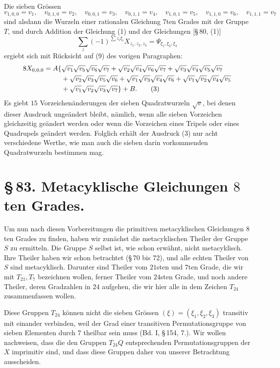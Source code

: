 \documentclass[11pt]{article}
\begin{document}
Die sieben Grössen
\begin{equation}
 v_{1,0,0}=v_1,
 \quad v_{0,1,0}=v_2,
 \quad v_{0,0,1}=v_3,
 \quad v_{0,1,1}=v_4,
 \quad v_{1,0,1}=v_5,
 \quad v_{1,1,0}=v_6,
 \quad v_{1,1,1}=v_7
 \tag{2}
\end{equation}
sind alsdann die Wurzeln einer rationalen Gleichung $7$ten Grades mit der Gruppe $T$, und durch Addition der Gleichung (1) und der Gleichungen [\S\,80, (1)]
\[
 \sum_z(-1)^{\sum z_i\xi_i}X_{z_1,z_2,z_3}=\Psi_{\xi_1,\xi_2,\xi_3}
\]
ergiebt sich mit Rücksicht auf (9) des vorigen Paragraphen:
\begin{align}
8X_{0,0,0}=A\{&\sqrt{v_1}\sqrt{v_5}\sqrt{v_6}\sqrt{v_7}
+\sqrt{v_2}\sqrt{v_4}\sqrt{v_6}\sqrt{v_7}
+\sqrt{v_3}\sqrt{v_4}\sqrt{v_5}\sqrt{v_7}\notag\\
&+\sqrt{v_2}\sqrt{v_3}\sqrt{v_5}\sqrt{v_6}
+\sqrt{v_1}\sqrt{v_3}\sqrt{v_4}\sqrt{v_6}
+\sqrt{v_1}\sqrt{v_2}\sqrt{v_4}\sqrt{v_5}\notag\\
&+\sqrt{v_1}\sqrt{v_2}\sqrt{v_3}\sqrt{v_7}\}+B.
\tag{3}
\end{align}
Es giebt $15$ Vorzeichenänderungen der sieben Quadratwurzeln $\sqrt v$, bei denen dieser Ausdruck ungeändert bleibt, nämlich, wenn alle sieben Vorzeichen gleichzeitig geändert werden oder wenn die Vorzeichen eines Tripels oder eines Quadrupels geändert werden. Folglich erhält der Ausdruck (3) nur acht verschiedene Werthe, wie man auch die sieben darin vorkommenden Quadratwurzeln bestimmen mag.

\section*{\S\,83. Metacyklische Gleichungen $8$ten Grades.}

Um nun nach diesen Vorbereitungen die primitiven metacyklischen Gleichungen $8$ten Grades zu finden, haben wir zunächst die metacyklischen Theiler der Gruppe $S$ zu ermitteln. Die Gruppe $S$ selbst ist, wie schon erwähnt, nicht metacyklisch. Ihre Theiler haben wir schon betrachtet (\S\,70 bis 72), und alle echten Theiler von $S$ sind metacyklisch. Darunter sind Theiler vom $21$sten und $7$ten Grade, die wir mit $T_{21},T_7$ bezeichnen wollen, ferner Theiler vom $24$sten Grade, und noch andere Theiler, deren Gradzahlen in $24$ aufgehen, die wir hier alle in dem Zeichen $T_{24}$ zusammenfassen wollen.

Diese Gruppen $T_{24}$ können nicht die sieben Grössen $(\xi)=(\xi_1,\xi_2,\xi_3)$ transitiv mit einander verbinden, weil der Grad einer transitiven Permutationsgruppe von sieben Elementen durch $7$ theilbar sein muss (Bd. I, \S\,154, 7.). Wir wollen nachweisen, dass die den Gruppen $T_{24}Q$ entsprechenden Permutationsgruppen der $X$ imprimitiv sind, und dass diese Gruppen daher von unserer Betrachtung ausscheiden.
\end{document}
